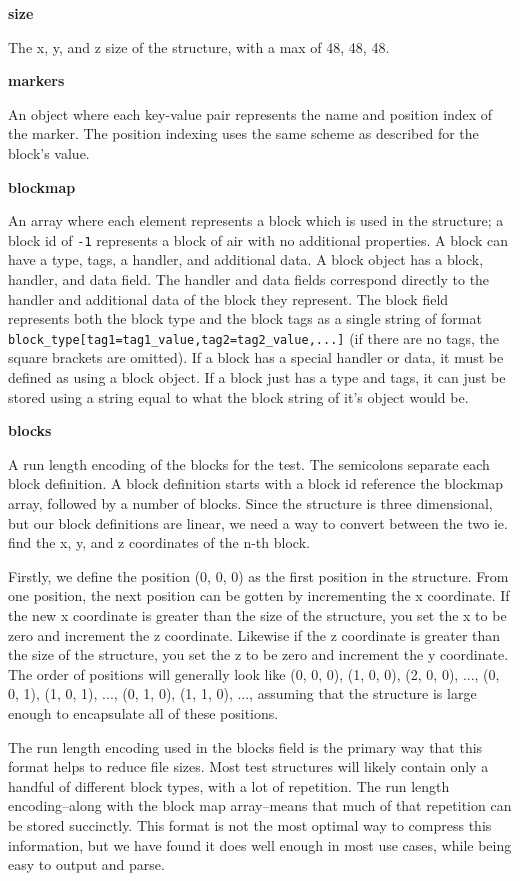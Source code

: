 \documentclass[12pt]{article}
\def\code#1{\texttt{#1}}
\begin{document}
\begin{onehalfspacing}
\noindent\textbf{size}

The x, y, and z size of the structure, with a max of 48, 48, 48.

\noindent\textbf{markers}

An object where each key-value pair represents the name and position
index of the marker. The position indexing uses the same scheme as
described for the block's value.

\noindent\textbf{blockmap}

An array where each element represents a block which is used in the
structure; a block id of \code{-1} represents a block of air with no additional
properties. A block can have a type, tags, a handler, and additional
data. A block object has a block, handler, and data field. The handler
and data fields correspond directly to the handler and additional data
of the block they represent. The block field represents both the block
type and the block tags as a single string of format
\code{block\_type{[}tag1=tag1\_value,tag2=tag2\_value,...{]}} (if there are
no tags, the square brackets are omitted). If a block has a special
handler or data, it must be defined as using a block object. If a block
just has a type and tags, it can just be stored using a string equal to
what the block string of it's object would be.

\noindent\textbf{blocks}

A run length encoding of the blocks for the test. The semicolons
separate each block definition. A block definition starts with a block
id reference the blockmap array, followed by a number of blocks. Since
the structure is three dimensional, but our block definitions are
linear, we need a way to convert between the two ie. find the x, y, and
z coordinates of the n-th block.

Firstly, we define the position (0, 0, 0) as the first position in the
structure. From one position, the next position can be gotten by
incrementing the x coordinate. If the new x coordinate is greater than
the size of the structure, you set the x to be zero and increment the z
coordinate. Likewise if the z coordinate is greater than the size of the
structure, you set the z to be zero and increment the y coordinate. The
order of positions will generally look like (0, 0, 0), (1, 0, 0), (2, 0,
0), ..., (0, 0, 1), (1, 0, 1), ..., (0, 1, 0), (1, 1, 0), ..., assuming
that the structure is large enough to encapsulate all of these
positions.

The run length encoding used in the blocks field is the primary way that
this format helps to reduce file sizes. Most test structures will likely
contain only a handful of different block types, with a lot of
repetition. The run length encoding--along with the block map
array--means that much of that repetition can be stored succinctly. This
format is not the most optimal way to compress this information, but we
have found it does well enough in most use cases, while being easy to
output and parse.


\end{onehalfspacing}
\end{document}
